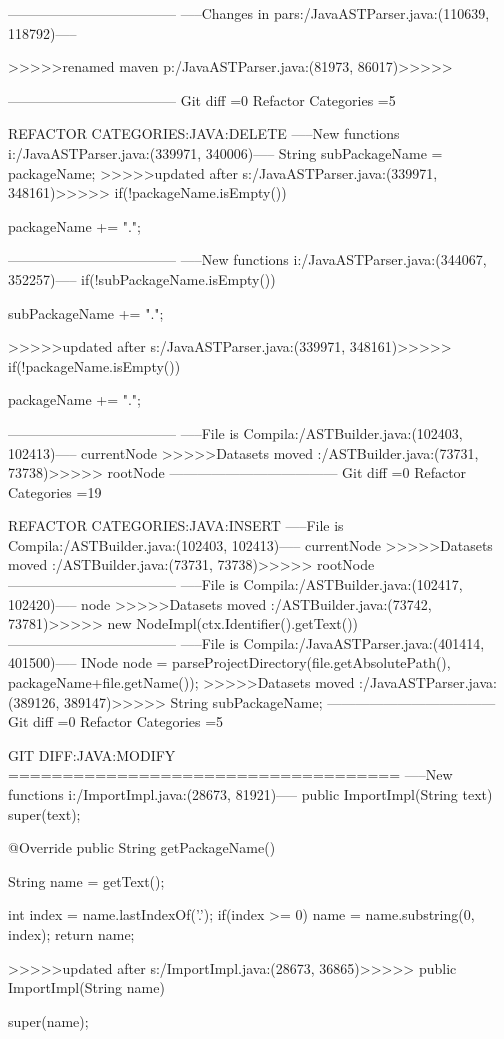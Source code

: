 {{{{{{{{{{{					
------------------------------------
-----Changes in pars:/JavaASTParser.java:(110639, 118792)-----


        
>>>>>renamed maven p:/JavaASTParser.java:(81973, 86017)>>>>>

 
------------------------------------
Git diff =0  Refactor Categories =5

REFACTOR CATEGORIES:JAVA:DELETE
-----New functions i:/JavaASTParser.java:(339971, 340006)-----
String subPackageName = packageName;
>>>>>updated after s:/JavaASTParser.java:(339971, 348161)>>>>>
if(!packageName.isEmpty()){
			packageName += ".";
	
------------------------------------
-----New functions i:/JavaASTParser.java:(344067, 352257)-----
if(!subPackageName.isEmpty()){
			subPackageName += ".";
	
>>>>>updated after s:/JavaASTParser.java:(339971, 348161)>>>>>
if(!packageName.isEmpty()){
			packageName += ".";
	
------------------------------------
-----File is Compila:/ASTBuilder.java:(102403, 102413)-----
currentNode
>>>>>Datasets moved :/ASTBuilder.java:(73731, 73738)>>>>>
rootNode
------------------------------------
Git diff =0  Refactor Categories =19

REFACTOR CATEGORIES:JAVA:INSERT
-----File is Compila:/ASTBuilder.java:(102403, 102413)-----
currentNode
>>>>>Datasets moved :/ASTBuilder.java:(73731, 73738)>>>>>
rootNode
------------------------------------
-----File is Compila:/ASTBuilder.java:(102417, 102420)-----
node
>>>>>Datasets moved :/ASTBuilder.java:(73742, 73781)>>>>>
new NodeImpl(ctx.Identifier().getText())
------------------------------------
-----File is Compila:/JavaASTParser.java:(401414, 401500)-----
INode node = parseProjectDirectory(file.getAbsolutePath(), packageName+file.getName());
>>>>>Datasets moved :/JavaASTParser.java:(389126, 389147)>>>>>
String subPackageName;
------------------------------------
Git diff =0  Refactor Categories =5

GIT DIFF:JAVA:MODIFY
====================================
-----New functions i:/ImportImpl.java:(28673, 81921)-----
	public ImportImpl(String text) {
		super(text);
	}

	@Override
	public String getPackageName() {
		String name = getText();
		
		int index = name.lastIndexOf('.');
		if(index >= 0){
			name = name.substring(0, index);
		}
		return name;
	
>>>>>updated after s:/ImportImpl.java:(28673, 36865)>>>>>
	public ImportImpl(String name) {
		super(name);
	
}}}}}}}}}}}}}}}}
